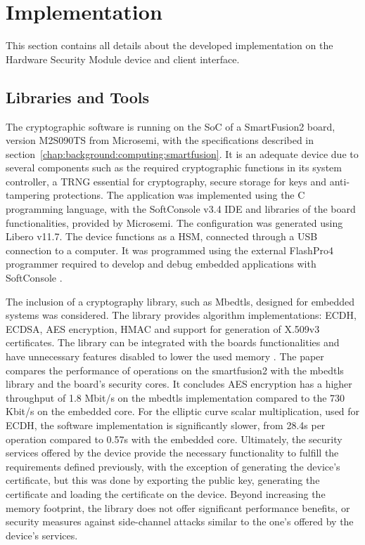 \section{Implementation}\label{chap:implementation:app}

This section contains all details about the developed implementation on the Hardware Security Module device and client interface.

\subsection{Libraries and Tools}\label{chap:implementation:app:tools}

The cryptographic software is running on the \ac{SoC} of a SmartFusion2 board, version M2S090TS from Microsemi, with the specifications described in section~\ref{chap:background:computing:smartfusion}. It is an adequate device due to several components such as the required cryptographic functions in its system controller, a \ac{TRNG} essential for cryptography, secure storage for keys and anti-tampering protections.
The application was implemented using the C programming language, with the SoftConsole v3.4 \ac{IDE} and libraries of the board functionalities, provided by Microsemi. The configuration was generated using Libero v11.7.
The device functions as a \ac{HSM}, connected through a \ac{USB} connection to a computer. It was programmed using the external FlashPro4 programmer required to develop and debug embedded applications with SoftConsole \cite{smartfusionSecurityPractices}.

The inclusion of a cryptography library, such as Mbedtls, designed for embedded systems was considered. The library provides algorithm implementations: ECDH, ECDSA, AES encryption, HMAC and support for generation of X.509v3 certificates. The library can be integrated with the boards functionalities and have unnecessary features disabled to lower the used memory \cite{parrinha2017flexible}.
The paper compares the performance of operations on the smartfusion2 with the mbedtls library and the board's security cores. It concludes AES encryption has a higher throughput of 1.8 Mbit/s on the mbedtls implementation compared to the 730 Kbit/s on the embedded core. For the elliptic curve scalar multiplication, used for ECDH, the software implementation is significantly slower, from 28.4s per operation compared to 0.57s with the embedded core.
Ultimately, the security services offered by the device provide the necessary functionality to fulfill the requirements defined previously, with the exception of generating the device's certificate, but this was done by exporting the public key, generating the certificate and loading the certificate on the device.
Beyond increasing the memory footprint, the library does not offer significant performance benefits, or security measures against side-channel attacks similar to the one's offered by the device's services.

